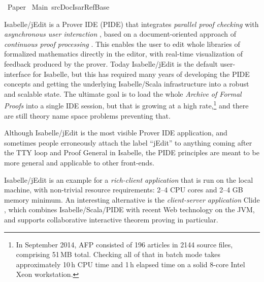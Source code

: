 %
\begin{isabellebody}%
\def\isabellecontext{Paper}%
%
\isadelimtheory
%
\endisadelimtheory
%
\isatagtheory
{}\isamarkupfalse%
\ Paper\isanewline
{}\ Main\ {\isachardoublequoteopen}{\isachartilde}{\isachartilde}{\isacharslash}src{\isacharslash}Doc{\isacharslash}Isar{\isacharunderscore}Ref{\isacharslash}Base{\isachardoublequoteclose}\isanewline
{}%
\endisatagtheory
{\isafoldtheory}%
%
\isadelimtheory
%
\endisadelimtheory
%
\isamarkuptrue%
%
\begin{isamarkuptext}%
Isabelle/jEdit is a Prover IDE (PIDE) that integrates \emph{parallel
proof checking} \cite{Wenzel:2009,Wenzel:2013:ITP} with \emph{asynchronous
user interaction}
\cite{Wenzel:2010,Wenzel:2012:UITP-EPTCS,Wenzel:2014:ITP-PIDE}, based on a
document-oriented approach of \emph{continuous proof processing}
\cite{Wenzel:2011:CICM,Wenzel:2012:CICM}. This enables the user to edit
whole libraries of formalized mathematics directly in the editor, with
real-time visualization of feedback produced by the prover. Today
Isabelle/jEdit is the default user-interface for Isabelle, but this has
required many years of developing the PIDE concepts and getting the
underlying Isabelle/Scala infrastructure into a robust and scalable state.
The ultimate goal is to load the whole \emph{Archive of Formal Proofs}
\cite{AFP} into a single IDE session, but that is growing at a high
rate,\footnote{In September 2014, AFP consisted of 196 articles in 2144
source files, comprising 51\,MB total. Checking all of that in batch mode
takes approximately 10\,h CPU time and 1\,h elapsed time on a solid 8-core
Intel Xeon workstation.} and there are still theory name space problems
preventing that.

\medskip Although Isabelle/jEdit is the most visible Prover IDE application,
and sometimes people erroneously attach the label ``jEdit'' to anything
coming after the TTY loop and Proof General \cite{Aspinall:TACAS:2000} in
Isabelle, the PIDE principles are meant to be more general and applicable to
other front-ends.

Isabelle/jEdit is an example for a \emph{rich-client application} that is
run on the local machine, with non-trivial resource requirements: 2--4 CPU
cores and 2--4 GB memory minimum. An interesting alternative is the
\emph{client-server application} Clide
\cite{Lueth-Ring:2013,Lueth-Ring:2014}, which combines Isabelle/Scala/PIDE
with recent Web technology on the JVM, and supports collaborative
interactive theorem proving in particular.


\end{isamarkuptext}
\end{isabellebody}

